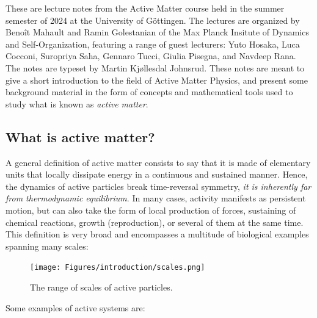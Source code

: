 \label{chapter: introduction}

These are lecture notes from the Active Matter course held in the summer semester of 2024 at the University of Göttingen.
The lectures are organized by Benoît Mahault and Ramin Golestanian of the Max Planck Insitute of Dynamics and Self-Organization, featuring a range of guest lecturers: Yuto Hosaka, Luca Cocconi, Suropriya Saha, Gennaro Tucci, Giulia Pisegna, and Navdeep Rana. 
The notes are typeset by Martin Kjøllesdal Johnsrud.
These notes are meant to give a short introduction to the field of Active Matter Physics, and present some background material in the form of concepts and mathematical tools used to study what is known as \textit{active matter}.



\subsection{What is active matter?}


A general definition of active matter consists to say that it is made of elementary units that locally dissipate energy in a continuous and sustained manner. Hence, the dynamics of active particles break time-reversal symmetry, \textit{it is inherently far from thermodynamic equilibrium}. In many cases, activity manifests as persistent motion, but can also take the form of local production of forces, sustaining of chemical reactions, growth (reproduction), or several of them at the same time. This definition is very broad and encompasses a multitude of biological examples spanning many scales:

\begin{figure}[!htb]
    \centering
    \texttt{[image: Figures/introduction/scales.png]}
    \caption{The range of scales of active particles.}
    \label{fig: scales active particles}
\end{figure}


Some examples of active systems are:

